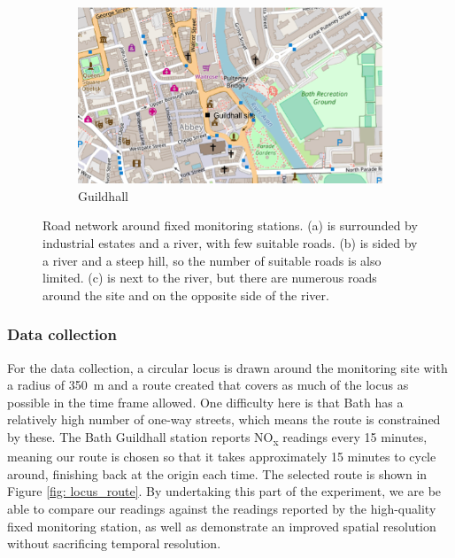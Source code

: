 \documentclass[11pt]{report}
\begin{document}
\begin{figure}[!tb]
\begin{minipage}{.9\linewidth}
\begin{subfigure}[t]{.5\linewidth}
            \includegraphics[width=\textwidth]{images/guildhall}
            \caption{Guildhall}
            \label{fig: guildhall}
        \end{subfigure}
    \end{minipage}
    \caption[Analysis of fixed monitoring station locations.]{Road network around fixed monitoring stations. (a) is surrounded by industrial estates and a river, with few suitable roads. (b) is sided by a river and a steep hill, so the number of suitable roads is also limited. (c) is next to the river, but there are numerous roads around the site and on the opposite side of the river.}
\end{figure}


\subsubsection{Data collection}

For the data collection, a circular locus is drawn around the monitoring site with a radius of 350~m and a route created that covers as much of the locus as possible in the time frame allowed. One difficulty here is that Bath has a relatively high number of one-way streets, which means the route is constrained by these. The Bath Guildhall station reports NO\textsubscript{x} readings every 15 minutes, meaning our route is chosen so that it takes approximately 15 minutes to cycle around, finishing back at the origin each time. The selected route is shown in Figure \ref{fig: locus_route}. By undertaking this part of the experiment, we are be able to compare our readings against the readings reported by the high-quality fixed monitoring station, as well as demonstrate an improved spatial resolution without sacrificing temporal resolution.
\end{document}
